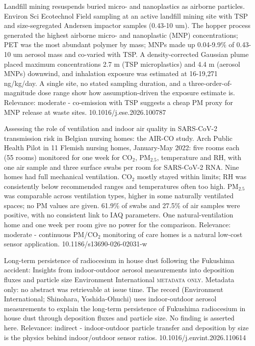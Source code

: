 \documentclass[10pt]{article}
\begin{document}
{Landfill mining resuspends buried micro- and nanoplastics as airborne particles.}
{Environ Sci Ecotechnol}
{Field sampling at an active landfill mining site with TSP and size-segregated Andersen impactor samples (0.43-10 um). The hopper process generated the highest airborne micro- and nanoplastic (MNP) concentrations; PET was the most abundant polymer by mass; MNPs made up 0.04-9.9\% of 0.43-10 um aerosol mass and co-varied with TSP. A density-corrected Gaussian plume placed maximum concentrations 2.7 m (TSP microplastics) and 4.4 m (aerosol MNPs) downwind, and inhalation exposure was estimated at 16-19,271 ng/kg/day. A single site, no stated sampling duration, and a three-order-of-magnitude dose range show how assumption-driven the exposure estimate is. Relevance: moderate - co-emission with TSP suggests a cheap PM proxy for MNP release at waste sites.}
{10.1016/j.ese.2026.100787}

{Assessing the role of ventilation and indoor air quality in SARS-CoV-2 transmission risk in Belgian nursing homes: the AIR-CO study.}
{Arch Public Health}
{Pilot in 11 Flemish nursing homes, January-May 2022: five rooms each (55 rooms) monitored for one week for CO$_2$, PM$_{2.5}$, temperature and RH, with one air sample and three surface swabs per room for SARS-CoV-2 RNA. Nine homes had full mechanical ventilation. CO$_2$ mostly stayed within limits; RH was consistently below recommended ranges and temperatures often too high. PM$_{2.5}$ was comparable across ventilation types, higher in some naturally ventilated spaces; no PM values are given. 61.9\% of swabs and 27.5\% of air samples were positive, with no consistent link to IAQ parameters. One natural-ventilation home and one week per room give no power for the comparison. Relevance: moderate - continuous PM/CO$_2$ monitoring of care homes is a natural low-cost sensor application.}
{10.1186/s13690-026-02031-w}

{Long-term persistence of radiocesium in house dust following the Fukushima accident: Insights from indoor-outdoor aerosol measurements into deposition fluxes and particle size}
{Environment International}
{\textsc{metadata only.} Metadata only: no abstract was retrievable at issue time. The record (Environment International; Shinohara, Yoshida-Ohuchi) uses indoor-outdoor aerosol measurements to explain the long-term persistence of Fukushima radiocesium in house dust through deposition fluxes and particle size. No finding is asserted here. Relevance: indirect - indoor-outdoor particle transfer and deposition by size is the physics behind indoor/outdoor sensor ratios.}
{10.1016/j.envint.2026.110614}
\end{document}
